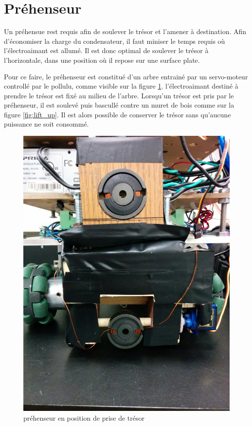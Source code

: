 \section{Préhenseur}

Un préhensue rest requis afin de soulever le trésor et l'amener à destination. Afin d'économiser la charge du condensateur, il faut miniser le temps requis où l'électroaimant est allumé. Il est donc optimal de soulever le trésor à l'horizontale, dans une position où il repose sur une surface plate. 

Pour ce faire, le préhenseur est constitué d'un arbre entrainé par un servo-moteur controllé par le pollulu, comme visible sur la figure \ref{fig:lift_down}. l'électroaimant destiné à prendre le trésor est fixé au milieu de l'arbre. Lorsqu'un trésor est pris par le préhenseur, il est soulevé puis bascullé contre un muret de bois comme sur la figure \ref{fig:lift_up}. Il est alors possible de conserver le trésor sans qu'aucune puissance ne soit consommé.

\begin{figure}[ht]
  \centering
  \includegraphics[scale=0.05]{resources/prehenseur_down.jpg}
  \caption{préhenseur en position de prise de trésor}
  \label{fig:lift_down}
\end{figure}

